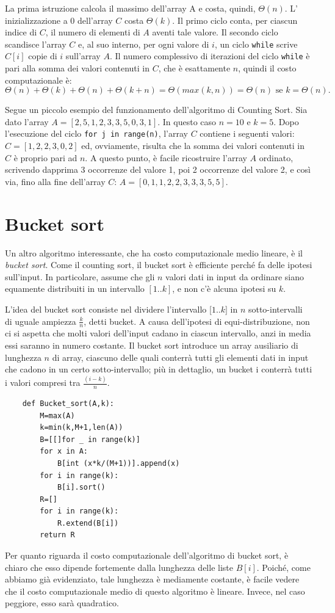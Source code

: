 La prima istruzione calcola il massimo dell'array A e costa, quindi, $\Theta(n)$. L’ inizializzazione a 0 dell'array $C$ costa $\Theta(k)$. Il primo ciclo conta, per ciascun indice di $C$, il numero di elementi di $A$ aventi tale valore. Il secondo ciclo scandisce l’array $C$ e, al suo interno, per ogni valore di $i$, un ciclo \verb|while| scrive $C[i]$ copie di $i$ sull’array $A$. Il numero complessivo di iterazioni del ciclo \verb|while| è pari alla somma dei valori contenuti in $C$, che è esattamente $n$, quindi il costo computazionale è:
\begin{equation*}
    \Theta(n) + \Theta(k) + \Theta(n) + \Theta(k+n) = \Theta(max(k,n)) = \Theta(n) \text{ se }k = \Theta(n).     
\end{equation*}

Segue un piccolo esempio del funzionamento dell’algoritmo di Counting Sort. Sia dato l’array $A = [2, 5, 1, 2, 3, 3, 5, 0, 3, 1]$. In questo caso $n = 10$ e $k=5$. Dopo l’esecuzione del ciclo \verb|for j in range(n)|, l’array $C$ contiene i seguenti valori: $C = [1, 2, 2, 3, 0, 2]$ ed, ovviamente, risulta che la somma dei valori contenuti in $C$ è proprio pari ad $n$. A questo punto, è facile ricostruire l’array $A$ ordinato, scrivendo dapprima 3 occorrenze del valore 1, poi 2 occorrenze del valore 2, e così via, fino alla fine dell’array $C$: $A = [0, 1, 1, 2, 2, 3, 3, 3, 5, 5]$.

\section{Bucket sort}
Un altro algoritmo interessante, che ha costo computazionale medio lineare, è il \textit{bucket sort}. Come il counting sort, il bucket sort è efficiente perché fa delle ipotesi sull'input. In particolare, assume che gli $n$ valori dati in input da ordinare siano equamente distribuiti in un intervallo $[1..k]$, e non c’è alcuna ipotesi su $k$.

L’idea del bucket sort consiste nel dividere l’intervallo [$1..k]$ in $n$ sotto-intervalli di uguale ampiezza $\frac{k}{n}$, detti bucket. A causa dell’ipotesi di equi-distribuzione, non ci si aspetta che molti valori dell'input cadano in ciascun intervallo, anzi in media essi saranno in numero costante.
Il bucket sort introduce un array ausiliario di lunghezza $n$ di array, ciascuno delle quali conterrà tutti gli elementi dati in input che cadono in un certo sotto-intervallo; più in dettaglio, un bucket i conterrà tutti i valori compresi tra $\frac{(i-k)}{n}$.
\begin{lstlisting}
    def Bucket_sort(A,k):
        M=max(A)
        k=min(k,M+1,len(A))
        B=[[]for _ in range(k)]
        for x in A:
            B[int (x*k/(M+1))].append(x)
        for i in range(k):
            B[i].sort()
        R=[]
        for i in range(k):
            R.extend(B[i])
        return R
\end{lstlisting}
Per quanto riguarda il costo computazionale dell'algoritmo di bucket sort, è chiaro che esso dipende fortemente dalla lunghezza delle liste $B[i]$. Poiché, come abbiamo già evidenziato, tale lunghezza è mediamente costante, è facile vedere che il costo computazionale medio di questo algoritmo è lineare. Invece, nel caso peggiore, esso sarà quadratico.

